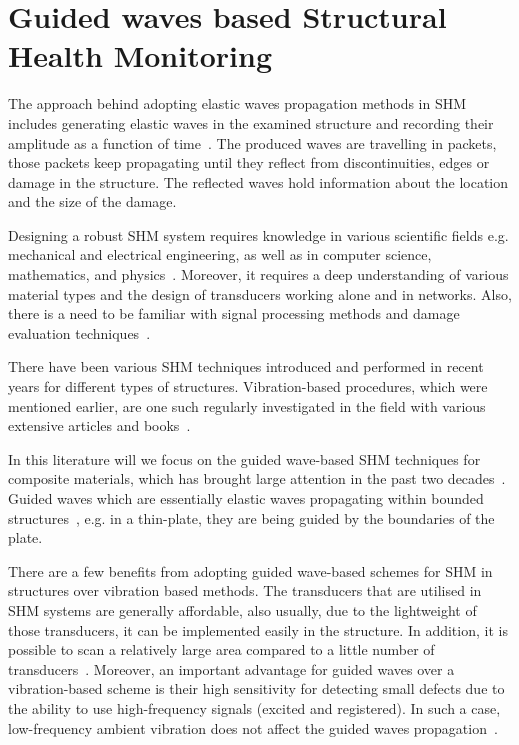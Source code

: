 \section[Guided waves based SHM]{Guided waves based Structural Health Monitoring}

The approach behind adopting elastic waves propagation methods in SHM includes generating elastic waves in the examined structure and recording their amplitude as a function of time~\cite{Ostachowicz2012}. 
The produced waves are travelling in packets, those packets keep propagating until 
they reflect from discontinuities, edges or damage in the structure. The reflected waves hold information about the location and the size of the damage. 

Designing a robust SHM system requires knowledge in various scientific fields e.g. mechanical and electrical engineering, as well as in computer science, mathematics, and physics~\cite{Willberg2013}.
Moreover, it requires a deep understanding of various material types and the design of transducers working alone and in networks. 
Also, there is a need to be familiar with signal processing methods and damage evaluation techniques~\cite{Willberg2013}.

There have been various SHM techniques introduced and performed in recent years for different types of structures. 
Vibration-based procedures, which were mentioned earlier, are one such regularly investigated in the field with various extensive articles and books~\cite{Doebling1998,Deraemaeker2010,Beskhyroun2012}.

In this literature will we focus on the guided wave-based SHM techniques for composite materials, which has brought large attention in the past two decades~\cite{Mitra2016}.
Guided waves which are essentially elastic waves propagating within bounded 
structures~\cite{Mitra2016}, e.g. in a thin-plate, they are being guided by the boundaries of the plate. 

There are a few benefits from adopting guided wave-based sche\-mes for SHM in structures over vibration based methods. 
The transducers that are utilised in SHM systems are generally affordable, also usually, due to the lightweight of those transducers, it can be implemented easily in the structure.
In addition, it is possible to scan a relatively large area compared to a little number of transducers~\cite{Mitra2016}. 
Moreover, an important advantage for guided waves over a vibration-based scheme 
is their high sensitivity for detecting small defects due to the ability to use high-frequency signals (excited and registered).
In such a case, low-frequency ambient vibration does not affect the guided waves propagation~\cite{Mitra2016,Croxford2007}.

